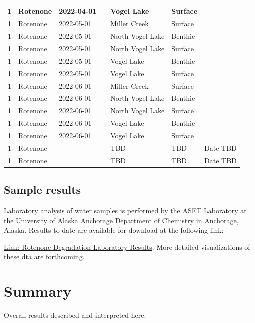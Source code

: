 \documentclass[
]{book}
\begin{document}
\begin{table}
\begin{tabular}[t]{r|l|l|l|l|l|l}
\hline
1 & Rotenone & 2022-04-01 &  & Vogel Lake & Surface & \\
\hline
1 & Rotenone & 2022-05-01 &  & Miller Creek & Surface & \\
\hline
1 & Rotenone & 2022-05-01 &  & North Vogel Lake & Benthic & \\
\hline
1 & Rotenone & 2022-05-01 &  & North Vogel Lake & Surface & \\
\hline
1 & Rotenone & 2022-05-01 &  & Vogel Lake & Benthic & \\
\hline
1 & Rotenone & 2022-05-01 &  & Vogel Lake & Surface & \\
\hline
1 & Rotenone & 2022-06-01 &  & Miller Creek & Surface & \\
\hline
1 & Rotenone & 2022-06-01 &  & North Vogel Lake & Benthic & \\
\hline
1 & Rotenone & 2022-06-01 &  & North Vogel Lake & Surface & \\
\hline
1 & Rotenone & 2022-06-01 &  & Vogel Lake & Benthic & \\
\hline
1 & Rotenone & 2022-06-01 &  & Vogel Lake & Surface & \\
\hline
1 & Rotenone &  &  & TBD & TBD & Date TBD\\
\hline
1 & Rotenone &  &  & TBD & TBD & Date TBD\\
\hline
\end{tabular}
\end{table}

\hypertarget{sample-results}{%
\section{Sample results}\label{sample-results}}

Laboratory analysis of water samples is performed by the ASET Laboratory at the University of Alaska Anchorage Department of Chemistry in Anchorage, Alaska. Results to date are available for download at the following link:

\href{https://github.com/Kenai-Watershed-Forum/Miller_Creek_Vogel_Lake_WQX/tree/main/input/rotenone_data}{Link: Rotenone Degradation Laboratory Results}. More detailed visualizations of these dta are forthcoming.

\hypertarget{summary-1}{%
\chapter{Summary}\label{summary-1}}

Overall results described and interpreted here.

  
\end{document}
